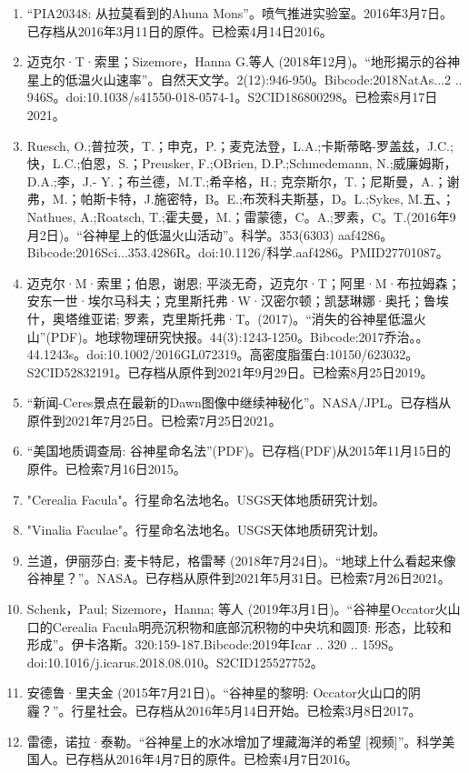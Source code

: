 \begin{enumerate}
\item “PIA20348: 从拉莫看到的Ahuna Mons”。喷气推进实验室。2016年3月7日。已存档从2016年3月11日的原件。已检索4月14日2016。
\item 迈克尔·T·索里；Sizemore，Hanna G.等人 (2018年12月)。“地形揭示的谷神星上的低温火山速率”。自然天文学。2(12):946-950。Bibcode:2018NatAs...2 .. 946S。doi:10.1038/s41550-018-0574-1。S2CID186800298。已检索8月17日2021。 
\item Ruesch, O.;普拉茨，T.；申克，P.；麦克法登，L.A.;卡斯蒂略-罗盖兹，J.C.;快，L.C.;伯恩，S.；Preusker, F.;OBrien, D.P.;Schmedemann, N.;威廉姆斯，D.A.;李，J.- Y.；布兰德，M.T.;希辛格，H.; 克奈斯尔，T.；尼斯曼，A.；谢弗，M.；帕斯卡特，J.施密特，B。E.;布茨科夫斯基，D。L.;Sykes, M.五、；Nathues, A.;Roatsch, T.;霍夫曼，M.；雷蒙德，C。A.;罗素，C。T.(2016年9月2日)。“谷神星上的低温火山活动”。科学。353(6303) aaf4286。Bibcode:2016Sci...353.4286R。doi:10.1126/科学.aaf4286。PMID27701087。 
\item 迈克尔·M·索里；伯恩，谢恩; 平淡无奇，迈克尔·T；阿里·M·布拉姆森；安东一世·埃尔马科夫；克里斯托弗·W·汉密尔顿；凯瑟琳娜·奥托；鲁埃什，奥塔维亚诺; 罗素，克里斯托弗·T。(2017)。“消失的谷神星低温火山”(PDF)。地球物理研究快报。44(3):1243-1250。Bibcode:2017乔治。。44.1243s。doi:10.1002/2016GL072319。高密度脂蛋白:10150/623032。S2CID52832191。已存档从原件到2021年9月29日。已检索8月25日2019。  
\item “新闻-Ceres景点在最新的Dawn图像中继续神秘化”。NASA/JPL。已存档从原件到2021年7月25日。已检索7月25日2021。
\item “美国地质调查局: 谷神星命名法”(PDF)。已存档(PDF)从2015年11月15日的原件。已检索7月16日2015。
\item "Cerealia Facula"。行星命名法地名。USGS天体地质研究计划。
\item "Vinalia Faculae"。行星命名法地名。USGS天体地质研究计划。
\item 兰道，伊丽莎白; 麦卡特尼，格雷琴 (2018年7月24日)。“地球上什么看起来像谷神星？”。NASA。已存档从原件到2021年5月31日。已检索7月26日2021。
\item Schenk，Paul; Sizemore，Hanna; 等人 (2019年3月1日)。“谷神星Occator火山口的Cerealia Facula明亮沉积物和底部沉积物的中央坑和圆顶: 形态，比较和形成”。伊卡洛斯。320:159-187.Bibcode:2019年Icar .. 320 .. 159S。doi:10.1016/j.icarus.2018.08.010。S2CID125527752。 
\item 安德鲁·里夫金 (2015年7月21日)。“谷神星的黎明: Occator火山口的阴霾？”。行星社会。已存档从2016年5月14日开始。已检索3月8日2017。
\item 雷德，诺拉·泰勒。“谷神星上的水冰增加了埋藏海洋的希望 [视频]”。科学美国人。已存档从2016年4月7日的原件。已检索4月7日2016。

\end{enumerate}
